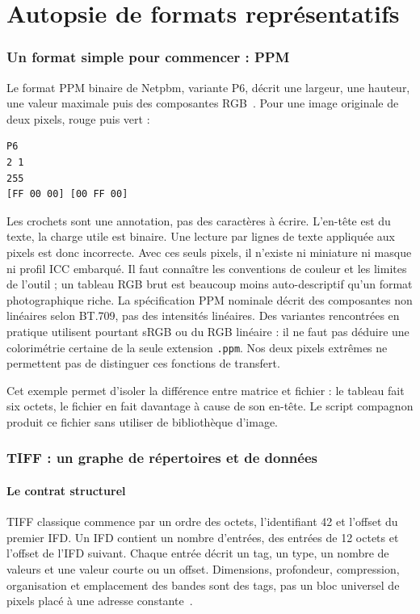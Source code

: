 \part{Autopsie de formats représentatifs}
\section{Un format simple pour commencer : PPM}
Le format PPM binaire de Netpbm, variante P6, décrit une largeur,
une hauteur, une valeur maximale puis des composantes RGB~\cite{netpbm}.
Pour une image originale de deux pixels, rouge puis vert :
\begin{verbatim}
P6
2 1
255
[FF 00 00] [00 FF 00]
\end{verbatim}
Les crochets sont une annotation, pas des caractères à écrire.
L'en-tête est du texte, la charge utile est binaire. Une lecture
par lignes de texte appliquée aux pixels est donc incorrecte.
Avec ces seuls pixels, il n'existe ni miniature ni masque ni
profil ICC embarqué. Il faut connaître les conventions de
couleur et les limites de l'outil ; un tableau RGB brut est
beaucoup moins auto-descriptif qu'un format photographique riche.
La spécification PPM nominale décrit des composantes non linéaires
selon BT.709, pas des intensités linéaires. Des variantes rencontrées
en pratique utilisent pourtant sRGB ou du RGB linéaire : il ne faut
pas déduire une colorimétrie certaine de la seule extension
\texttt{.ppm}. Nos deux pixels extrêmes ne permettent pas de
distinguer ces fonctions de transfert.

Cet exemple permet d'isoler la différence entre matrice et
fichier : le tableau fait six octets, le fichier en fait
davantage à cause de son en-tête. Le script compagnon produit
ce fichier sans utiliser de bibliothèque d'image.

\section{TIFF : un graphe de répertoires et de données}
\subsection{Le contrat structurel}
TIFF classique commence par un ordre des octets, l'identifiant
42 et l'offset du premier IFD. Un IFD contient un nombre
d'entrées, des entrées de 12 octets et l'offset de l'IFD suivant.
Chaque entrée décrit un tag, un type, un nombre de valeurs et
une valeur courte ou un offset. Dimensions, profondeur,
compression, organisation et emplacement des bandes sont
des tags, pas un bloc universel de pixels placé à une adresse
constante~\cite{tiff}.

